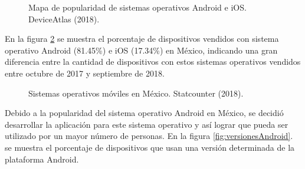 \begin{figure}[htbp!]
	\centering
	\caption{Mapa de popularidad de sistemas operativos Android e iOS. DeviceAtlas (2018).}
	\label{fig:mapaOS}
\end{figure}

En la figura \ref{fig:mercadoMexico} se muestra el porcentaje de dispositivos vendidos con sistema operativo Android (81.45\%) e iOS (17.34\%) en México, indicando una gran diferencia entre la cantidad de dispositivos con estos sistemas operativos vendidos entre octubre de 2017 y septiembre de 2018. \\

\begin{figure}[htbp!]
	\centering
	\caption{Sistemas operativos móviles en México. Statcounter (2018).}
	\label{fig:mercadoMexico}
\end{figure}

Debido a la popularidad del sistema operativo Android en México, se decidió desarrollar la aplicación para este sistema operativo y así lograr que pueda ser utilizado por un mayor número de personas. En la figura \ref{fig:versionesAndroid}. se muestra el porcentaje de dispositivos que  usan una versión determinada de la plataforma Android. \\

